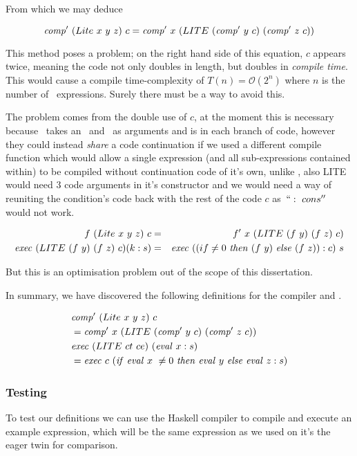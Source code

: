 \documentclass {article}
\begin{document}
From which we may deduce 

	\[ \mathit{comp'\ }  (Lite\ x\ y\ z)\ c 
		= \mathit{comp'\ }  x\ (LITE\ (\mathit{comp'\ }  y\ c)\ (\mathit{comp'\ }  z\ c)) \]

This method poses a problem;
on the right hand side of this equation,
$c$ appears twice, meaning the code not only 
doubles in length, but doubles in \emph{compile time}.
This would cause a compile time-complexity of
\( T(n) = \mathcal{O}(2^n) \)
where $n$ is the number of \lite\ expressions.
Surely there must be a way to avoid this.

The problem comes from the double use of $c$,
at the moment this is necessary because \compp\
takes an \expr\ and \code\ as arguments and is in
each branch of code,
however they could instead \emph{share}
a code continuation if we used a different compile function
which would allow a single expression 
(and all sub-expressions contained within)  
to be compiled without continuation code of it's own,
unlike \compp, also LITE would need 3 code arguments in
it's constructor and we would need a way of 
reuniting the condition's code back with the rest of the code $c$
as~$``:\ cons''$ would not work.

\begin{eqnarray*}
f\ (Lite\ x\ y\ z)\ c &=& f'\ x\ (LITE\ (f\ y)\ (f\ z)\ c) \\
\mathit{exec\ } (LITE\ (f\ y)\ (f\ z)\ c) (k : s) 
&=& \mathit{exec\ } ((if \not=0\ \mathit{then\ } (f\ y)\ \mathit{else\ } (f\ z)) : c)\ s 
\end{eqnarray*}

But this is an optimisation problem out of the scope of this dissertation.

In summary, we have discovered the following 
definitions for the compiler and \vm.

\begin{eqnarray}
&\mathit{comp'\ }  (Lite\ x\ y\ z)\ c \nonumber \\
	&= \mathit{comp'\ }  x\ (LITE\ (\mathit{comp'\ }  y\ c)\ (\mathit{comp'\ }  z\ c)) \label{complite} \\
&\mathit{exec\ } (LITE\ ct\ ce)\ (\mathit{eval\ }  x:s) \nonumber \\
	&= \mathit{exec\ } c\ (\mathit{if\ } \mathit{eval\ }  x\ \not= 0\ \mathit{then\ } \mathit{eval\ }  y\ \mathit{else\ } \mathit{eval\ }  z : s) \label{execlite}
\end{eqnarray}

\subsubsection{Testing}

To test our definitions we can use the Haskell compiler
to compile and execute an example \lite expression,
which will be the same expression as we used
on it's the eager twin for comparison.
\end{document}
